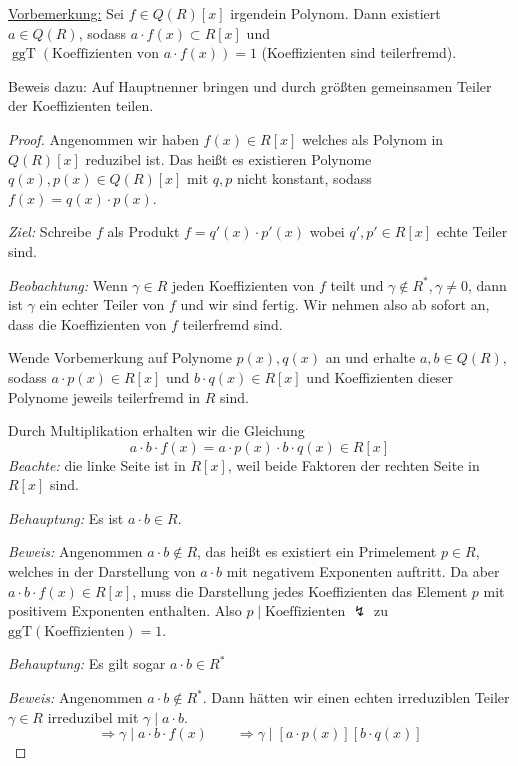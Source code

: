 \documentclass[a4paper,12pt,numbers=noenddot,parskip=full]{scrartcl}
\newcommand{\heading}{\underline}
\theoremstyle{dotless}
\theoremstyle{remark}
\begin{document}
	\heading{Vorbemerkung:} Sei $f \in Q(R)[x]$ irgendein Polynom. Dann existiert $a \in Q(R)$, sodass $a \cdot f(x) \subset R[x]$ und $\operatorname{ggT}(\text{Koeffizienten von } a \cdot f(x)) = 1$ (Koeffizienten sind teilerfremd).
	
	Beweis dazu: Auf Hauptnenner bringen und durch größten gemeinsamen Teiler der Koeffizienten teilen.
	
	\begin{proof}
		Angenommen wir haben $f(x) \in R[x]$ welches als Polynom in $Q(R)[x]$ reduzibel ist. Das heißt es existieren Polynome $q(x), p(x) \in Q(R)[x]$ mit $q,p$ nicht konstant, sodass $f(x) = q(x) \cdot p(x)$.
		
		\textit{Ziel:} Schreibe $f$ als Produkt $f = q'(x) \cdot p'(x)$ wobei $q',p' \in R[x]$ echte Teiler sind.
		
		\textit{Beobachtung:} Wenn $\gamma \in R$ jeden Koeffizienten von $f$ teilt und $\gamma \notin R^*, \gamma \neq 0$, dann ist $\gamma$ ein echter Teiler von $f$ und wir sind fertig. Wir nehmen also ab sofort an, dass die Koeffizienten von $f$ teilerfremd sind.
		
		Wende Vorbemerkung auf Polynome $p(x), q(x)$ an und erhalte $a,b \in Q(R)$, sodass $a \cdot p(x) \in R[x]$ und $b \cdot q(x) \in R[x]$ und Koeffizienten dieser Polynome jeweils teilerfremd in $R$ sind.
		
		Durch Multiplikation erhalten wir die Gleichung
		\begin{equation*}
			a \cdot b \cdot f(x) = a \cdot p(x) \cdot b \cdot q(x) \in R[x] \tag{$*$}
		\end{equation*}
		\textit{Beachte:} die linke Seite ist in $R[x]$, weil beide Faktoren der rechten Seite in $R[x]$ sind.
		
		\textit{Behauptung:} Es ist $a \cdot b \in R$.
		
		\textit{Beweis:} Angenommen $a \cdot b \notin R$, das heißt es existiert ein Primelement $p \in R$, welches in der Darstellung von $a \cdot b$ mit negativem Exponenten auftritt. Da aber $a \cdot b \cdot f(x) \in R[x]$, muss die Darstellung jedes Koeffizienten das Element $p$ mit positivem Exponenten enthalten. Also $p \mid \text{Koeffizienten}$ $\lightning$ zu $\operatorname{ggT(\text{Koeffizienten})} = 1$.
		
		\textit{Behauptung:} Es gilt sogar $a \cdot b \in R^*$
		
		\textit{Beweis:} Angenommen $a \cdot b \notin R^*$. Dann hätten wir einen echten irreduziblen Teiler $\gamma \in R$ irreduzibel mit $\gamma \mid a \cdot b$.
		\begin{equation*}
			\Rightarrow \gamma \mid a \cdot b \cdot f(x) \qquad \Rightarrow \gamma \mid [a \cdot p(x)][b \cdot q(x)]
		\end{equation*}
		

\end{proof}
\end{document}
